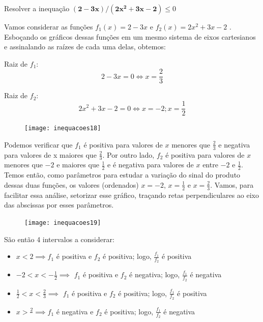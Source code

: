 \begin{example}{Resolver a inequação $\bm{(2-3x)/(2x^2+3x-2)}\leq0$}

Vamos considerar as funções $f_1(x)=2-3x$ e $f_2(x)=2x^2+3x-2$ . Esboçando os gráficos dessas funções em um mesmo sistema de eixos cartesianos e assinalando as raízes de cada uma delas, obtemos:


\begin{multicols}{2}
\centering
Raiz de $f_1$:
\begin{equation*}
2-3x=0\iff x=\frac{2}{3}
\end{equation*}

Raiz de $f_2$:
\begin{equation*}
2x^2+3x-2=0\iff x=-2;x=\frac{1}{2}
\end{equation*}
\end{multicols}

\begin{figure}[H]
\centering

\texttt{[image: inequacoes18]}
\end{figure}


Podemos verificar que $f_1$ é positiva para valores de $x$ menores que $\frac{2}{3}$ e negativa para valores de x maiores que $\frac{2}{3}$.  Por outro lado, $f_2$ é positiva para valores de $x$ menores que $-2$ e maiores que $\frac{1}{2}$ e é negativa para valores de $x$ entre $-2$ e $\frac{1}{2}$. Temos então, como parâmetros para estudar a variação do sinal do produto dessas duas funções, os valores (ordenados) $x=-2$, $x=\frac{1}{2}$ e $x=\frac{2}{3}$. Vamos, para facilitar essa análise, setorizar esse gráfico, traçando retas perpendiculares ao eixo das abscissas por esses parâmetros.

\begin{figure}[H]
\centering

\texttt{[image: inequacoes19]}
\end{figure}

São então 4 intervalos a considerar:
\begin{itemize}
\item $x<2\implies f_1$ é positiva e $f_2$ é positiva; logo, $\frac{f_1}{f_2}$ é positiva
\item $-2<x<-\frac{1}{2} \implies$ $f_1$ é positiva e $f_2$ é negativa; logo, $\frac{f_1}{f_2}$ é negativa
\item $\frac{1}{2}<x<\frac{2}{3} \implies$ $f_1$ é positiva e $f_2$ é positiva; logo, $\frac{f_1}{f_2}$ é positiva
\item $x>\frac{2}{} \implies f_1$ é negativa e $f_2$ é positiva; logo, $\frac{f_1}{f_2}$ é negativa
\end{itemize}



\end{example}
